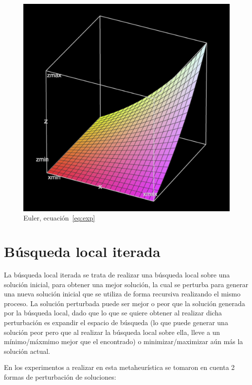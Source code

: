 \documentclass{ci5652}
\begin{document}
\begin{figure}[p]
	\centering
	\includegraphics[width=\linewidth]{euler-3b}
	\caption{Euler, ecuación~\ref{eq:exp}}
	\label{fig:euler3}
\end{figure}


\section{Búsqueda local iterada}
La búsqueda local iterada se trata de realizar una búsqueda local sobre una solución inicial, para obtener una mejor solución, la cual se perturba para generar una nueva solución inicial que se utiliza de forma recursiva realizando el mismo proceso. La solución perturbada puede ser mejor o peor que la solución generada por la búsqueda local, dado que lo que se quiere obtener al realizar dicha perturbación es expandir el espacio de búsqueda (lo que puede generar una solución peor pero que al realizar la búsqueda local sobre ella, lleve a un mínimo/máxmimo mejor que el encontrado) o minimizar/maximizar aún más la solución actual.

En los experimentos a realizar en esta metaheurística se tomaron en cuenta 2 formas de perturbación de soluciones:
\end{document}
